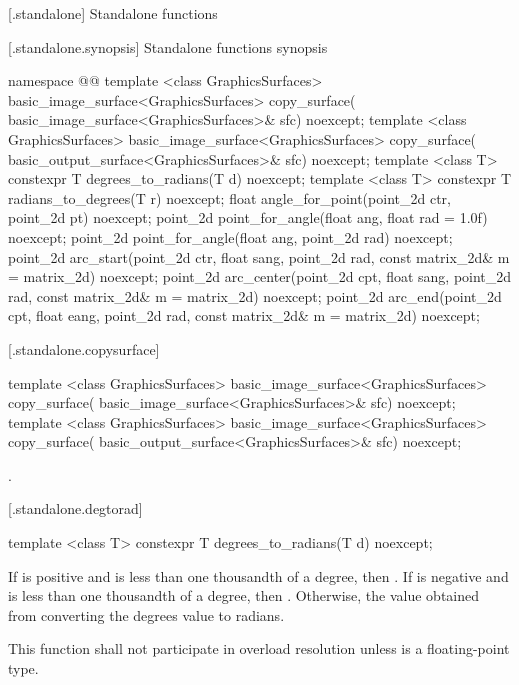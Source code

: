  [\iotwod.standalone] {Standalone functions}

 [\iotwod.standalone.synopsis] {Standalone functions synopsis}

\begin{codeblock}
namespace @\fullnamespace{}@ {
  template <class GraphicsSurfaces>
  basic_image_surface<GraphicsSurfaces> copy_surface(
    basic_image_surface<GraphicsSurfaces>& sfc) noexcept;
  template <class GraphicsSurfaces>
  basic_image_surface<GraphicsSurfaces> copy_surface(
    basic_output_surface<GraphicsSurfaces>& sfc) noexcept;
  template <class T>
  constexpr T degrees_to_radians(T d) noexcept;
  template <class T>
  constexpr T radians_to_degrees(T r) noexcept;
  float angle_for_point(point_2d ctr, point_2d pt) noexcept;
  point_2d point_for_angle(float ang, float rad = 1.0f) noexcept;
  point_2d point_for_angle(float ang, point_2d rad) noexcept;
  point_2d arc_start(point_2d ctr, float sang, point_2d rad, 
    const matrix_2d& m = matrix_2d{}) noexcept;
  point_2d arc_center(point_2d cpt, float sang, point_2d rad, 
    const matrix_2d& m = matrix_2d{}) noexcept;
  point_2d arc_end(point_2d cpt, float eang, point_2d rad, 
    const matrix_2d& m = matrix_2d{}) noexcept;
}
\end{codeblock}

 [\iotwod.standalone.copysurface] {}

%
\begin{itemdecl}
template <class GraphicsSurfaces>
basic_image_surface<GraphicsSurfaces> copy_surface(
  basic_image_surface<GraphicsSurfaces>& sfc) noexcept;
template <class GraphicsSurfaces>
basic_image_surface<GraphicsSurfaces> copy_surface(
  basic_output_surface<GraphicsSurfaces>& sfc) noexcept;
\end{itemdecl}
\begin{itemdescr}
\pnum
\returns
{}.
\end{itemdescr}

 [\iotwod.standalone.degtorad] {}
\begin{itemdecl}
template <class T>
constexpr T degrees_to_radians(T d) noexcept;
\end{itemdecl}
\begin{itemdescr}
\returns
If  is positive and is less than one thousandth of a degree, then . If  is negative and is less than one thousandth of a degree, then . Otherwise, the value obtained from converting the degrees value  to radians.

\remarks
This function shall not participate in overload resolution unless  is a floating-point type.
\end{itemdescr}

